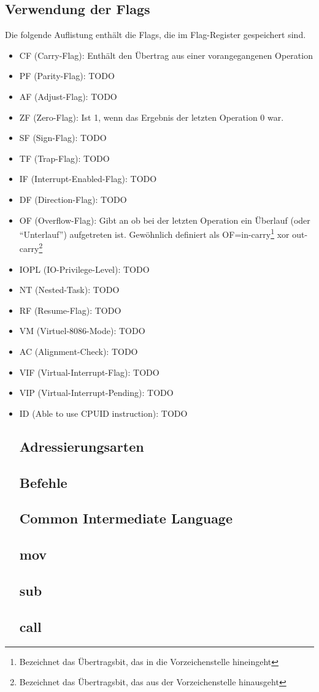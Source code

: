 \begin{multicols}{3}
\subsection{Verwendung der Flags}
Die folgende Auflistung enthält die Flags, die im Flag-Register gespeichert sind.
\begin{itemize}
\item CF (Carry-Flag): Enthält den Übertrag aus einer vorangegangenen Operation
\item PF (Parity-Flag): TODO
\item AF (Adjust-Flag): TODO
\item ZF (Zero-Flag): Ist 1, wenn das Ergebnis der letzten Operation 0 war.
\item SF (Sign-Flag): TODO
\item TF (Trap-Flag): TODO
\item IF (Interrupt-Enabled-Flag): TODO
\item DF (Direction-Flag): TODO
\item OF (Overflow-Flag): Gibt an ob bei der letzten Operation ein Überlauf (oder \enquote{Unterlauf}) aufgetreten ist. Gewöhnlich definiert als OF=in-carry\footnote{Bezeichnet das Übertragsbit, das in die Vorzeichenstelle hineingeht} xor out-carry\footnote{Bezeichnet das Übertragsbit, das aus der Vorzeichenstelle hinausgeht}
\item IOPL (IO-Privilege-Level): TODO
\item NT (Nested-Task): TODO
\item RF (Resume-Flag): TODO
\item VM (Virtuel-8086-Mode): TODO
\item AC (Alignment-Check): TODO
\item VIF (Virtual-Interrupt-Flag): TODO
\item VIP (Virtual-Interrupt-Pending): TODO
\item ID (Able to use CPUID instruction): TODO
\section{Adressierungsarten}
\section{Befehle}
\section{Common Intermediate Language}
\subsection{mov}
\subsection{sub}
\subsection{call}

\end{itemize}
\end{multicols}